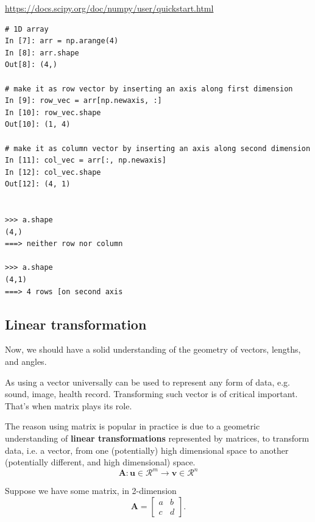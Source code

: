\url{https://docs.scipy.org/doc/numpy/user/quickstart.html}


\begin{verbatim}
# 1D array
In [7]: arr = np.arange(4)
In [8]: arr.shape
Out[8]: (4,) 

# make it as row vector by inserting an axis along first dimension
In [9]: row_vec = arr[np.newaxis, :]
In [10]: row_vec.shape
Out[10]: (1, 4)

# make it as column vector by inserting an axis along second dimension
In [11]: col_vec = arr[:, np.newaxis]
In [12]: col_vec.shape
Out[12]: (4, 1)


>>> a.shape
(4,)
===> neither row nor column 

>>> a.shape
(4,1)
===> 4 rows [on second axis
\end{verbatim}

\subsection{Linear transformation}
\label{sec:linear-transformation}

Now, we should have a solid understanding of the geometry of vectors, lengths,
and angles.

As using a vector universally can be used to represent any form of data, e.g.
sound, image, health record. Transforming such vector is of critical important.
That's when matrix plays its role.

The reason using matrix is popular in practice is due to a geometric
understanding of {\bf linear transformations} represented by matrices, to
transform data, i.e. a vector, from one (potentially) high dimensional space to
another (potentially different, and high dimensional) space.
\begin{equation}
\mathbf{A}: \mathbf{u} \in \mathcal{R}^m \longrightarrow \mathbf{v} \in \mathcal{R}^n
\end{equation}

Suppose we have some matrix, in 2-dimension
\begin{equation}
\mathbf{A} = \begin{bmatrix}
a & b \\ c & d
\end{bmatrix}.
\end{equation}


